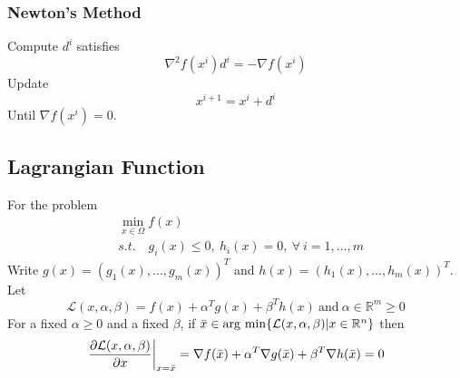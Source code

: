 \documentclass[../main.tex]{subfiles}
\begin{document}
            \subsubsection{Newton's Method}
                Compute $d^i$ satisfies
                \[
                    \nabla^2 f(x^i)d^i = -\nabla f(x^i)
                \]
                Update
                \[
                    x^{i+1} = x^i + d^i
                \]
                Until $\nabla f(x^i)=0$.
        \subsection{Lagrangian Function}
            For the problem
            \begin{align*}
                &\min_{x\in\Omega} f(x)\\
                &s.t.\quad g_i(x)\leq 0,~h_i(x)=0,~\forall~i=1,\dots,m
            \end{align*}
            Write $g(x)=(g_1(x),\dots,g_m(x))^T$ and $h(x)=(h_1(x),\dots,h_m(x))^T$.
            Let 
            \[
                \mathcal{L}(x,\alpha,\beta)=f(x)+\alpha^Tg(x)+\beta^Th(x) \mathrm{~and~} \alpha\in\mathbb{R}^m\geq 0
            \]
            For a fixed $\alpha\geq 0$ and a fixed $\beta$, if $\Bar{x}\in\operatorname*{arg~min}\{\mathcal{L}(x,\alpha,\beta)|x\in\mathbb{R}^n\}$ then
            \[
                \left.\frac{\partial\mathcal{L}(x,\alpha,\beta)}{\partial x}\right|_{x=\Bar{x}}=\nabla f(\Bar{x}) + \alpha^T\nabla g(\Bar{x})+\beta^T\nabla h(\Bar{x})=0
            \]
            
\end{document}
